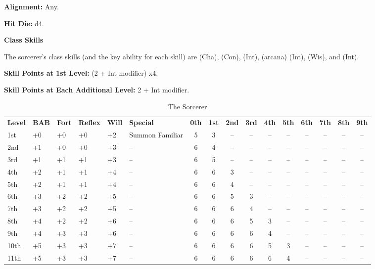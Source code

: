 
\textbf{Alignment:} Any.

\textbf{Hit Die:} d4.

\textbf{Class Skills}

The sorcerer's class skills (and the key ability for each skill) are  (Cha), 
 (Con),  (Int),  (arcana) (Int),  (Wis), and 
 (Int).

\textbf{Skill Points at 1st Level:} (2 + Int modifier) x4.

\textbf{Skill Points at Each Additional Level: }2 + Int modifier.

\begin{table}[htb]
\caption{The Sorcerer}
\centering
\begin{tabular}{*{5}{l}p{1.5cm}*{10}{c}}
\textbf{Level} & \textbf{BAB} & \textbf{Fort} & \textbf{Reflex} & \textbf{Will} & \textbf{Special} & \textbf{0th} & \textbf{1st} & \textbf{2nd} & \textbf{3rd} & \textbf{4th} & \textbf{5th} & \textbf{6th} & \textbf{7th} & \textbf{8th} & \textbf{9th} \\
1st & +0 & +0 & +0 & +2 & Summon Familiar & 5 & 3 & -- & -- & -- & -- & -- & -- & -- & --\\
2nd & +1 & +0 & +0 & +3 & -- & 6 & 4 & -- & -- & -- & -- & -- & -- & -- & --\\
3rd & +1 & +1 & +1 & +3 & -- & 6 & 5 & -- & -- & -- & -- & -- & -- & -- & --\\
4th & +2 & +1 & +1 & +4 & -- & 6 & 6 & 3 & -- & -- & -- & -- & -- & -- & --\\
5th & +2 & +1 & +1 & +4 & -- & 6 & 6 & 4 & -- & -- & -- & -- & -- & -- & --\\
6th & +3 & +2 & +2 & +5 & -- & 6 & 6 & 5 & 3 & -- & -- & -- & -- & -- & --\\
7th & +3 & +2 & +2 & +5 & -- & 6 & 6 & 6 & 4 & -- & -- & -- & -- & -- & --\\
8th & +4 & +2 & +2 & +6 & -- & 6 & 6 & 6 & 5 & 3 & -- & -- & -- & -- & --\\
9th & +4 & +3 & +3 & +6 & -- & 6 & 6 & 6 & 6 & 4 & -- & -- & -- & -- & --\\
10th & +5 & +3 & +3 & +7 & -- & 6 & 6 & 6 & 6 & 5 & 3 & -- & -- & -- & --\\
11th & +5 & +3 & +3 & +7 & -- & 6 & 6 & 6 & 6 & 6 & 4 & -- & -- & -- & --\\

\end{tabular}
\end{table}
